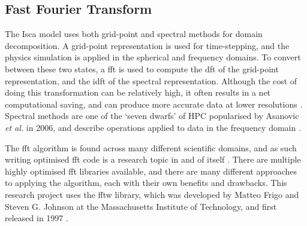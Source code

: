 \documentclass[a4paper,11pt]{report}
\begin{document}
\subsection{Fast Fourier Transform}
The Isca model uses both grid-point and spectral methods for domain decomposition. A grid-point representation is used for time-stepping, and the physics simulation is applied in the spherical and frequency domains. To convert between these two states, a \gls{fft} is used to compute the \gls{dft} of the grid-point representation, and the \gls{idft} of the spectral representation. Although the cost of doing this transformation can be relatively high, it often results in a net computational saving, and can produce more accurate data at lower resolutions \cite{bader2008climate}. Spectral methods are one of the `seven dwarfs' of HPC popularised by Asanovic \textit{et al.} in 2006, and describe operations applied to data in the frequency domain \cite{asanovic2006landscape} .
\par
The \gls{fft} algorithm is found across many different scientific domains, and as such writing optimised \gls{fft} code is a research topic in and of itself \cite{singleton1967method, cooley1965algorithm, sorensen1987real}. There are multiple highly optimised \gls{fft} libraries available, and there are many different approaches to applying the algorithm, each with their own benefits and drawbacks. This research project uses the \gls{fftw} library, which was developed by Matteo Frigo and Steven G. Johnson at the Massachusetts Institute of Technology, and first released in 1997 \cite{frigo1998fftw}. 
\end{document}
